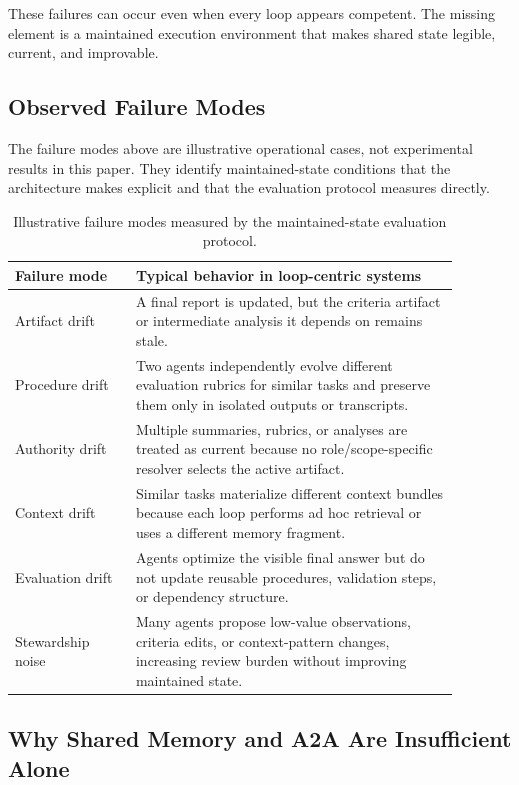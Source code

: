 \documentclass{article}
\begin{document}
These failures can occur even when every loop appears competent. The missing element is a maintained execution environment that makes shared state legible, current, and improvable.

\subsection{Observed Failure Modes}

The failure modes above are illustrative operational cases, not experimental results in this paper. They identify maintained-state conditions that the architecture makes explicit and that the evaluation protocol measures directly.

\begin{table}[H]
\centering
\small
\begin{tabular}{p{0.24\linewidth}p{0.64\linewidth}}
\toprule
\textbf{Failure mode} & \textbf{Typical behavior in loop-centric systems} \\
\midrule
Artifact drift & A final report is updated, but the criteria artifact or intermediate analysis it depends on remains stale. \\
Procedure drift & Two agents independently evolve different evaluation rubrics for similar tasks and preserve them only in isolated outputs or transcripts. \\
Authority drift & Multiple summaries, rubrics, or analyses are treated as current because no role/scope-specific resolver selects the active artifact. \\
Context drift & Similar tasks materialize different context bundles because each loop performs ad hoc retrieval or uses a different memory fragment. \\
Evaluation drift & Agents optimize the visible final answer but do not update reusable procedures, validation steps, or dependency structure. \\
Stewardship noise & Many agents propose low-value observations, criteria edits, or context-pattern changes, increasing review burden without improving maintained state. \\
\bottomrule
\end{tabular}
\caption{Illustrative failure modes measured by the maintained-state evaluation protocol.}
\label{tab:failure-patterns}
\end{table}

\subsection{Why Shared Memory and A2A Are Insufficient Alone}
\end{document}
